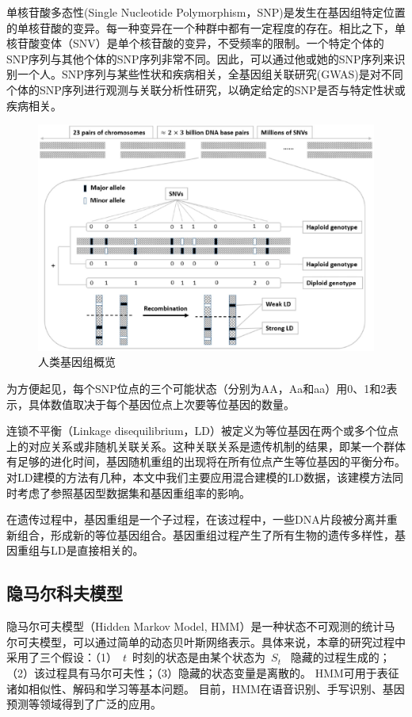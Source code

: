 单核苷酸多态性(Single Nucleotide Polymorphism，SNP)是发生在基因组特定位置的单核苷酸的变异。每一种变异在一个种群中都有一定程度的存在。相比之下，单核苷酸变体（SNV）是单个核苷酸的变异，不受频率的限制。一个特定个体的SNP序列与其他个体的SNP序列非常不同。因此，可以通过他或她的SNP序列来识别一个人。SNP序列与某些性状和疾病相关，全基因组关联研究(GWAS)是对不同个体的SNP序列进行观测与关联分析性研究，以确定给定的SNP是否与特定性状或疾病相关。

\begin{figure}[htbp]
	\centering
	\includegraphics[width = 0.9\linewidth]{./figures/Fig1-human-genomic-overview.eps}
	\caption{人类基因组概览\cite{samani2015quantifying}
	}
	\label{fig:human-genomic-overview}
\end{figure}

为方便起见，每个SNP位点的三个可能状态（分别为AA，Aa和aa）用0、1和2表示，具体数值取决于每个基因位点上次要等位基因的数量。

连锁不平衡（Linkage disequilibrium，LD）被定义为等位基因在两个或多个位点上的对应关系或非随机关联关系。这种关联关系是遗传机制的结果，即某一个群体有足够的进化时间，基因随机重组的出现将在所有位点产生等位基因的平衡分布。对LD建模的方法有几种，本文中我们主要应用混合建模的LD数据，该建模方法同时考虑了参照基因型数据集和基因重组率的影响。

在遗传过程中，基因重组是一个子过程，在该过程中，一些DNA片段被分离并重新组合，形成新的等位基因组合。基因重组过程产生了所有生物的遗传多样性，基因重组与LD是直接相关的。

\subsection{隐马尔科夫模型}

隐马尔可夫模型（Hidden Markov Model, HMM）\cite{rabiner1989tutorial,stamp2004revealing}是一种状态不可观测的统计马尔可夫模型，可以通过简单的动态贝叶斯网络表示。具体来说，本章的研究过程中采用了三个假设：（1）~$t$~时刻的状态是由某个状态为~$S_t$~ 隐藏的过程生成的；（2）该过程具有马尔可夫性；（3）隐藏的状态变量是离散的。
HMM可用于表征诸如相似性、解码和学习等基本问题。 目前，HMM在语音识别\cite{rabiner1989tutorial}、手写识别\cite{hu1996hmm}、基因预测\cite{durbin1998biological}等领域得到了广泛的应用。

